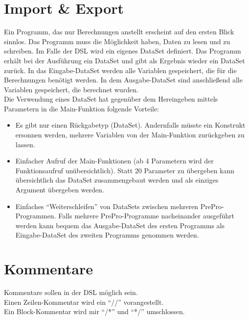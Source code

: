 \section{Import \& Export}
\label{sec:Import}

Ein Programm, das nur Berechnungen anstellt erscheint auf den ersten Blick sinnlos.
Das Programm muss die Möglichkeit haben, Daten zu lesen und zu schreiben.
Im Falle der DSL wird ein eigenes DataSet definiert.
Das Programm erhält bei der Ausführung ein DataSet und gibt als Ergebnis wieder ein DataSet zurück.
In das Eingabe-DataSet werden alle Variablen gespeichert, die für die Berechnungen benötigt werden.
In dem Ausgabe-DataSet sind anschließend alle Variablen gespeichert, die berechnet wurden.\\
Die Verwendung eines DataSet hat gegenüber dem Hereingeben mittels Parametern in die Main-Funktion folgende Vorteile:
\begin{itemize}
\item Es gibt nur einen Rückgabetyp (DataSet).
Andernfalls müsste ein Konstrukt ersonnen werden, mehrere Variablen von der Main-Funktion zurückgeben zu lassen.
\item Einfacher Aufruf der Main-Funktionen (ab 4 Parametern wird der Funktionsaufruf unübersichtlich\cite{parameterCount}). Statt 20 Parameter zu übergeben kann übersichtlich das DataSet zusammengebaut werden und als einziges Argument übergeben werden.
\item Einfaches ``Weiterschleifen'' von DataSets zwischen mehreren PrePro-Programmen.
Falls mehrere PrePro-Programme nacheinander ausgeführt werden kann bequem das Ausgabe-DataSet des ersten Programms als Eingabe-DataSet des zweiten Programms genommen werden.
\end{itemize}

\section{Kommentare}
Kommentare sollen in der \ac{DSL} möglich sein.\\
Einen Zeilen-Kommentar wird ein ``//'' vorangestellt.\\
Ein Block-Kommentar wird mir ``/*'' und ``*/'' umschlossen.

\endinput
